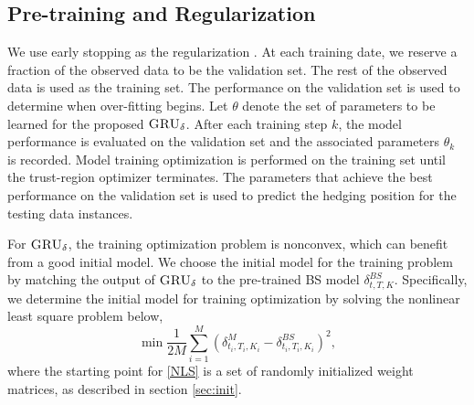 \documentclass[letterpaper,12pt,titlepage,oneside,final]{book}
\numberwithin{equation}{section}
\theoremstyle{definition}
\newcommand{\model}{\textsc{GRU}_\delta}
\begin{document}
\subsection{Pre-training and  Regularization} \label{sec:preT}
We use  early stopping as the regularization \citep{raskutti2014early}.
At each training date, we reserve a fraction of the observed data to be the validation set. The rest of the observed data is used as the training set. The performance on the validation set is used to determine when over-fitting begins. Let $\theta$ denote the set of parameters to be learned for the proposed $\model$. After each training step $k$,  the model performance is evaluated on the validation set and the associated parameters $\theta_k$ is recorded.  Model training optimization is performed on the training set until the trust-region optimizer terminates. The parameters that achieve the best performance on the validation set  is used to predict the hedging position for the testing data instances.

For $\model$,  the training optimization problem  is nonconvex,   which can benefit from a good initial model.   We choose the initial model for the training  problem  by matching  the output of $\model$ to  the pre-trained BS model  $\delta^{BS}_{t,T,K}$.  Specifically,  we determine the initial model for training optimization by solving the nonlinear least square problem below,
\begin{equation}\label{NLS}
\min \frac{1}{2M} \sum_{i=1}^{M} ( \delta^M_{t_i,T_i,K_i} -\delta^{BS}_{t_i,T_i,K_i})^2,
\end{equation}
where the starting point for \eqref{NLS} is a set of randomly initialized  weight matrices, as described in section \ref{sec:init}.
\end{document}
